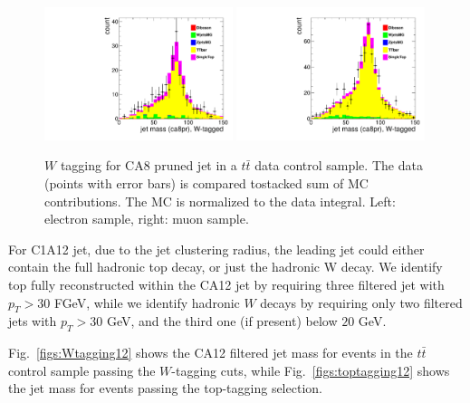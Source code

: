 \begin{figure}[!htb]
\centering
\includegraphics[width=0.49\textwidth]{figs/Wen/taggedW_ca8pr.pdf}
\includegraphics[width=0.49\textwidth]{figs/Wmn/taggedW_ca8pr.pdf}
\caption{$W$ tagging for CA8 pruned jet in a $t\bar{t}$ data control sample. The data (points with error bars) is compared tostacked sum of MC contributions. The MC is normalized to the data integral. Left: electron sample, right: muon sample.}
\label{figs:Wtagging08}
\end{figure}
  
For C1A12 jet, due to the jet clustering radius, the leading jet could either contain the full hadronic top decay, or just the hadronic W decay. We identify top fully reconstructed within the CA12 jet by requiring three filtered jet with $p_T>30$ FGeV, while we identify hadronic $W$ decays by requiring only two filtered jets with $p_T > $30 GeV, and the third one (if present) below $20$ GeV.

Fig.~\ref{figs:Wtagging12} shows the CA12 filtered jet mass for events in the $t\bar{t}$ control sample passing the $W$-tagging cuts, while Fig.~\ref{figs:toptagging12} shows the jet mass for events passing the top-tagging selection.

